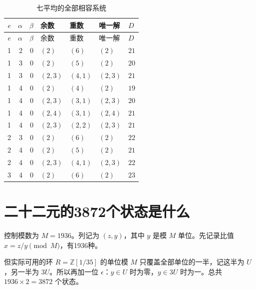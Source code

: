 \documentclass[11pt,a4paper,oneside,openany]{book}
\newcommand{\Z}{\mathbb Z}
\theoremstyle{definition}
\numberwithin{equation}{chapter}
\begin{document}
\begingroup\small
\begin{longtable}{rrrllll}
\caption{七平均的全部相容系统}\label{tab:seven-data}\\
\toprule $e$&$\alpha$&$\beta$&余数&重数&唯一解&$D$\\\midrule\endfirsthead
\toprule $e$&$\alpha$&$\beta$&余数&重数&唯一解&$D$\\\midrule\endhead
1&2&0&$(2)$&$(6)$&$(2)$&$21$\\
1&3&0&$(2)$&$(5)$&$(2)$&$20$\\
1&3&0&$(2,3)$&$(4,1)$&$(2,3)$&$21$\\
1&4&0&$(2)$&$(4)$&$(2)$&$19$\\
1&4&0&$(2,3)$&$(3,1)$&$(2,3)$&$20$\\
1&4&0&$(2,4)$&$(3,1)$&$(2,4)$&$21$\\
1&4&0&$(2,3)$&$(2,2)$&$(2,3)$&$21$\\
2&3&0&$(2)$&$(6)$&$(2)$&$22$\\
2&4&0&$(2)$&$(5)$&$(2)$&$21$\\
2&4&0&$(2,3)$&$(4,1)$&$(2,3)$&$22$\\
3&4&0&$(2)$&$(6)$&$(2)$&$23$\\
\bottomrule\end{longtable}\endgroup

\section{二十二元的3872个状态是什么}
控制模数为 $M=1936$。列记为 $(z,y)$，其中 $y$ 是模 $M$ 单位。先记录比值 $x=z/y\pmod M$，有1936种。

但实际可用的环 $R=\Z[1/35]$ 的单位模 $M$ 只覆盖全部单位的一半，记这半为 $U$，另一半为 $3U$。所以再加一位 $\epsilon$：$y\in U$ 时为零，$y\in3U$ 时为一。总共 $1936\times2=3872$ 个状态。
\end{document}
